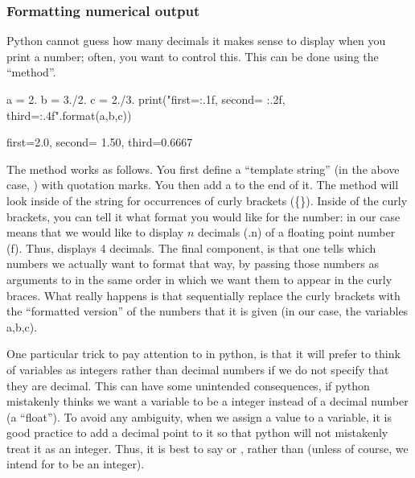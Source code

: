 \subsubsection{Formatting numerical output}
Python cannot guess how many decimals it makes sense to display when you print a number; often, you want to control this. This can be done using the  ``method''.
\begin{python}[caption=Formatted printing] 
a = 2. 
b = 3./2.
c = 2./3.
print("first={:.1f}, second= {:.2f}, third={:.4f}".format(a,b,c))
\end{python}
\begin{poutput}
first=2.0, second= 1.50, third=0.6667
\end{poutput}
The  method works as follows. You first define a ``template string'' (in the above case, ) with quotation marks. You then add a  to the end of it. The  method will look inside of the string for occurrences of curly brackets (\{\}). Inside of the curly brackets, you can tell it what format you would like for the number: in our case  means that we would like to display $n$ decimals (.n) of a floating point number (f). Thus,  displays 4 decimals. The final component, is that one tells  which numbers we actually want to format that way, by passing those numbers as arguments to  in the same order in which we want them to appear in the curly braces. What really happens is that  sequentially replace the curly brackets with the ``formatted version'' of the numbers that it is given (in our case, the variables a,b,c).


One particular trick to pay attention to in python, is that it will prefer to think of variables as integers rather than decimal numbers if we do not specify that they are decimal. This can have some unintended consequences, if python mistakenly thinks we want a variable to be a integer instead of a decimal number (a ``float''). To avoid any ambiguity, when we assign a value to a variable, it is good practice to add a decimal point to it so that python will not mistakenly treat it as an integer. Thus, it is best to say  or , rather than  (unless of course, we intend for  to be an integer).

